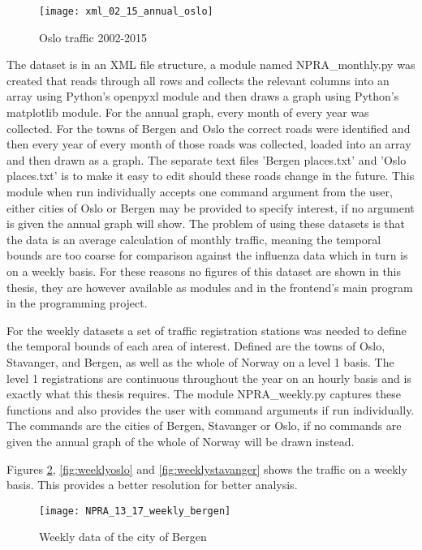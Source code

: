 \begin{figure}[ht]
\texttt{[image: xml\_02\_15\_annual\_oslo]}
\centering
\caption{Oslo traffic 2002-2015}
\label{fig:anualoslo}
\end{figure}
The dataset is in an XML file structure, a module named NPRA\_monthly.py was created that reads through all rows and collects the relevant columns into an array using Python's openpyxl module and then draws a graph using Python's matplotlib module. For the annual graph, every month of every year was collected. For the towns of Bergen and Oslo the correct roads were identified and then every year of every month of those roads was collected, loaded into an array and then drawn as a graph. The separate text files 'Bergen places.txt' and 'Oslo places.txt' is to make it easy to edit should these roads change in the future. This module when run individually accepts one command argument from the user, either cities of Oslo or Bergen may be provided to specify interest, if no argument is given the annual graph will show. The problem of using these datasets is that the data is an average calculation of monthly traffic, meaning the temporal bounds are too coarse for comparison against the influenza data which in turn is on a weekly basis. For these reasons no figures of this dataset are shown in this thesis, they are however available as modules and in the frontend's main program in the programming project.

For the weekly datasets a set of traffic registration stations was needed to define the temporal bounds of each area of interest. Defined are the towns of Oslo, Stavanger, and Bergen, as well as the whole of Norway on a level 1 basis. The level 1 registrations are continuous throughout the year on an hourly basis and is exactly what this thesis requires. The module NPRA\_weekly.py captures these functions and also provides the user with command arguments if run individually. The commands are the cities of Bergen, Stavanger or Oslo, if no commands are given the annual graph of the whole of Norway will be drawn instead.

Figures \ref{fig:weeklybergen}, \ref{fig:weeklyoslo} and \ref{fig:weeklystavanger} shows the traffic on a weekly basis. This provides a better resolution for better analysis.
\begin{figure}[ht]
\texttt{[image: NPRA\_13\_17\_weekly\_bergen]}
\centering
\caption{Weekly data of the city of Bergen}
\label{fig:weeklybergen}
\end{figure}

